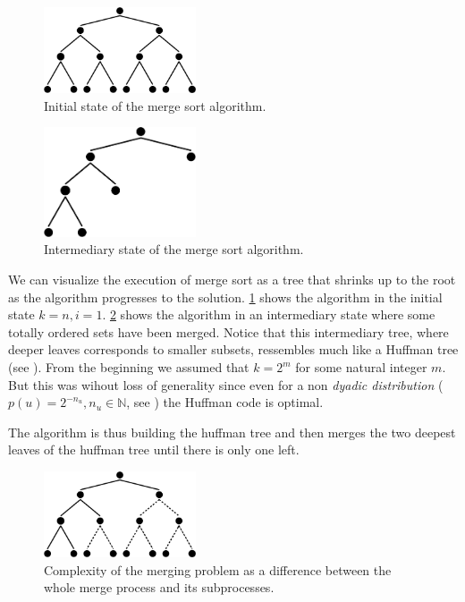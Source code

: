 \begin{figure}
	\centering
	\includegraphics[width=0.4\textwidth]{fig/merging/huffman-1-trim}
	\caption{\label{tree:merging:fig/huffman-1} Initial state of the merge sort algorithm.}
\end{figure}

\begin{figure}
	\centering
	\includegraphics[width=0.4\textwidth]{fig/merging/huffman-3-trim}
	\caption{\label{tree:merging:fig/huffman-3} Intermediary state of the merge sort algorithm.}
\end{figure}

We can visualize the execution of merge sort as a tree that shrinks up to the root as the algorithm progresses to the solution. \ref{tree:merging:fig/huffman-1} shows the algorithm in the initial state $k = n, i = 1$. \ref{tree:merging:fig/huffman-3} shows the algorithm in an intermediary state where some totally ordered sets have been merged. Notice that this intermediary tree, where deeper leaves corresponds to smaller subsets, ressembles much like a Huffman tree (see \cite{huffman1952method}). From the beginning we assumed that $k = 2^m$ for some natural integer $m$. But this was wihout loss of generality since even for a non \emph{dyadic distribution} ($p(u) = 2^{-n_u}, n_u \in \mathbb{N}$, see \cite{cover2012elements}) the Huffman code is optimal.

The algorithm is thus building the huffman tree and then merges the two deepest leaves of the huffman tree until there is only one left.

\begin{figure}
	\centering
	\includegraphics[width=0.4\textwidth]{fig/merging/huffman-2-trim}
	\caption{\label{tree:merging:fig/huffman-2} Complexity of the merging problem as a difference between the whole merge process and its subprocesses.}
\end{figure}

